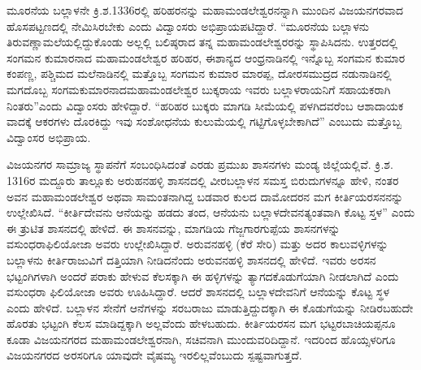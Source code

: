 ಮೂರನೆಯ ಬಲ್ಲಾಳನೇ ಕ್ರಿ.ಶ.1336ರಲ್ಲಿ ಹರಿಹರನನ್ನು ಮಹಾಮಂಡಲೇಶ್ವರನನ್ನಾಗಿ ಮುಂದಿನ ವಿಜಯನಗರವಾದ ಹೊಸಪಟ್ಟಣದಲ್ಲಿ ನೇಮಿಸಿರಬೇಕು ಎಂದು ವಿದ್ವಾಂಸರು ಅಭಿಪ್ರಾಯಪಟಿದ್ದಾರೆ. “ಮೂರನೆಯ ಬಲ್ಲಾಳನು ತಿರುವಣ್ಣಾಮಲೆ\-ಯಲ್ಲಿದ್ದುಕೊಂಡು ಅಲ್ಲಲ್ಲಿ ಬಲಿಷ್ಠರಾದ ತನ್ನ ಮಹಾಮಂಡಲೇಶ್ವರರನ್ನು ಸ್ಥಾಪಿಸಿದನು. ಉತ್ತರದಲ್ಲಿ ಸಂಗಮನ ಕುಮಾರನಾದ ಮಹಾಮಂಡಲೇಶ್ವರ ಹರಿಹರ, ಈಶಾನ್ಯದ ಆಂಧ್ರನಾಡಿನಲ್ಲಿ ಇನ್ನೊಬ್ಬ ಸಂಗಮನ ಕುಮಾರ ಕಂಪಣ್ಣ, ಪಶ್ಚಿಮದ ಮಲೆನಾಡಿನಲ್ಲಿ ಮತ್ತೊಬ್ಬ ಸಂಗಮನ ಕುಮಾರ ಮಾರಪ್ಪ, ದೋರಸಮುದ್ರದ ನಡುನಾಡಿನಲ್ಲಿ ಮಗದೊಬ್ಬ ಸಂಗಮಕುಮಾರನಾದ\break ಮಹಾಮಂಡಲೇಶ್ವರ ಬುಕ್ಕರಾಯ ಇವರು ಬಲ್ಲಾಳರಾಯನಿಗೆ ಸಹಾಯಕರಾಗಿ ನಿಂತರು”ಎಂದು ವಿದ್ವಾಂಸರು ಹೇಳಿದ್ದಾರೆ. “ಹರಿಹರ ಬುಕ್ಕರು ಮಾಗಡಿ ಸೀಮೆಯಲ್ಲಿ ಪಳಗಿದವರೆಂಬ ಆಶಾದಾಯಕ ವಾದಕ್ಕೆ ಆಕರಗಳು ದೊರಕಿದ್ದು ಇವು ಸಂಶೋಧನೆಯ ಕುಲುಮೆಯಲ್ಲಿ ಗಟ್ಟಿಗೊಳ್ಳಬೇಕಾಗಿದೆ” ಎಂಬುದು ಮತ್ತೊಬ್ಬ ವಿದ್ವಾಂಸರ ಅಭಿಪ್ರಾಯ.

ವಿಜಯನಗರ ಸಾಮ್ರಾಜ್ಯ ಸ್ಥಾಪನೆಗೆ ಸಂಬಂಧಿಸಿದಂತೆ ಎರಡು ಪ್ರಮುಖ ಶಾಸನಗಳು ಮಂಡ್ಯ ಜಿಲ್ಲೆಯಲ್ಲಿವೆ. ಕ್ರಿ.ಶ. 1316ರ ಮದ್ದೂರು ತಾಲ್ಲೂಕು ಅರುಹನಹಳ್ಳಿ ಶಾಸನದಲ್ಲಿ ವೀರಬಲ್ಲಾಳನ ಸಮಸ್ತ ಬಿರುದುಗಳನ್ನೂ ಹೇಳಿ, ನಂತರ ಅವನ ಮಹಾಮಂಡಲೇಶ್ವರ ಅಥವಾ ಸಾಮಂತನಾಗಿದ್ದ ಬಡವಾರ ಕುಲದ ದಾಮೋದರನ ಮಗ ಕೀರ್ತಿಯರಸನನನ್ನು ಉಲ್ಲೇಖಿಸಿದೆ. “ಕೀರ್ತಿದೇವನು ಆನೆಯನ್ನು ಹಡದು ತಂದ, ಆನೆಯನು ಬಲ್ಲಾಳದೇವನತ್ಯಂತವಾಗಿ ಕೊಟ್ಟ ಸ್ತಳ” ಎಂದು ಈ ತ್ರುಟಿತ ಶಾಸನದಲ್ಲಿ ಹೇಳಿದೆ. ಈ ಶಾಸನವನ್ನು, ಮಾಗಡಿಯ ಗೆಜ್ಜಗಾರಗುಪ್ಪೆಯ ಶಾಸನಗಳನ್ನು ವಸುಂಧರಾಫಿಲಿಯೋಜಾ ಅವರು ಉಲ್ಲೇಖಿಸಿದ್ದಾರೆ. ಅರುವನಹಳ್ಳಿ (ಕೆರೆ ಸೇರಿ) ಮತ್ತು ಅದರ ಕಾಲುವಳ್ಳಿಗಳನ್ನು ಬಲ್ಲಾಳನು ಕೀರ್ತಿರಾಜುವಿಗೆ ದತ್ತಿಯಾಗಿ ನೀಡಿದನೆಂದು ಅರುವನಹಳ್ಳಿ ಶಾಸನದಲ್ಲಿ ಹೇಳಿದೆ. ಇವರು ಅರಸನ ಭಟ್ಟಂಗಿಗಳಾಗಿ ಅಂದರೆ ಪರಾಕು ಹೇಳುವ ಕೆಲಸಕ್ಕಾಗಿ ಈ ಹಳ್ಳಿಗಳನ್ನು ತ್ಯಾಗದಕೊಡುಗೆಯಾಗಿ ನೀಡಲಾಗಿದೆ ಎಂದು ವಸುಂಧರಾ ಫಿಲಿಯೋಜಾ ಅವರು ಊಹಿಸಿದ್ದಾರೆ. ಆದರೆ ಶಾಸನದಲ್ಲಿ ಬಲ್ಲಾಳದೇವನಿಗೆ ಆನೆಯನ್ನು ಕೊಟ್ಟ ಸ್ಥಳ ಎಂದು ಹೇಳಿದೆ. ಬಲ್ಲಾಳನ ಸೇನೆಗೆ ಆನೆಗಳನ್ನು ಸರಬರಾಜು ಮಾಡುತ್ತಿದ್ದುದಕ್ಕಾಗಿ ಈ ಕೊಡುಗೆಯನ್ನು ನೀಡಿರಬಹುದೇ ಹೊರತು ಭಟ್ಟಂಗಿ ಕೆಲಸ ಮಾಡಿದ್ದಕ್ಕಾಗಿ ಅಲ್ಲವೆಂದು ಹೇಳಬಹುದು. ಕೀರ್ತಿಯರಸನ ಮಗ ಭಟ್ಟರಬಾಚಿಯಪ್ಪನೂ ಕೂಡಾ ವಿಜಯನಗರದ ಮಹಾಮಂಡಲೇಶ್ವರನಾಗಿ, ಸಚಿವನಾಗಿ ಮುಂದುವರಿದಿದ್ದಾನೆ. ಇದರಿಂದ ಹೊಯ್ಸಳರಿಗೂ ವಿಜಯನಗರದ ಅರಸರಿಗೂ ಯಾವುದೇ ವೈಷಮ್ಯ ಇರಲಿಲ್ಲವೆಂಬುದು ಸ್ಪಷ್ಟವಾಗುತ್ತದೆ. 

